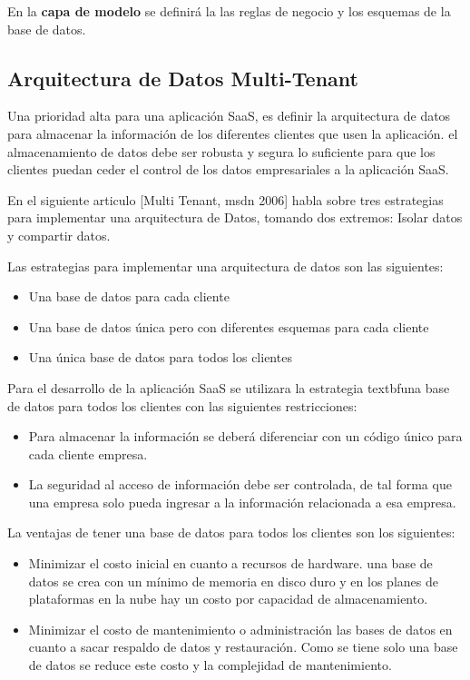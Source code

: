 \noindent En la \textbf{capa de modelo} se definirá la las reglas de negocio y los esquemas de la base de datos. 

\subsection{Arquitectura de Datos Multi-Tenant}
\noindent Una prioridad alta para una aplicación SaaS, es definir la arquitectura de datos para almacenar la información de los diferentes clientes que usen la aplicación. el almacenamiento de datos debe ser robusta y segura lo suficiente para que los clientes puedan ceder el control de los datos empresariales a la aplicación SaaS.

\noindent En el siguiente articulo [Multi Tenant, msdn 2006] habla sobre tres estrategias para implementar una arquitectura de Datos, tomando dos extremos: Isolar datos y compartir datos.

\noindent Las estrategias para implementar una arquitectura de datos son las siguientes:
\begin{itemize}
\item Una base de datos para cada cliente 
\item Una base de datos única pero con diferentes esquemas para cada cliente
\item Una única base de datos para todos los clientes
\end{itemize}

\noindent Para el desarrollo de la aplicación SaaS se utilizara la estrategia textbf{una base de datos para todos los clientes} con las siguientes restricciones:
\begin{itemize}
\item Para almacenar la información se deberá diferenciar con un código único para cada cliente empresa.
\item La seguridad al acceso de información debe ser controlada, de tal forma que una empresa solo pueda ingresar a la información relacionada a esa empresa.
\end{itemize}

\noindent La ventajas de tener una base de datos para todos los clientes son los siguientes:
\begin{itemize}
\item Minimizar el costo inicial en cuanto a recursos de hardware. una base de datos se crea con un mínimo de memoria en disco duro y en los planes de plataformas en la nube hay un costo por capacidad de almacenamiento.
\item Minimizar el costo de mantenimiento o administración las bases de datos en cuanto a sacar respaldo de datos y restauración. Como se tiene solo una base de datos se reduce este costo y la complejidad de mantenimiento.  
\end{itemize} 


